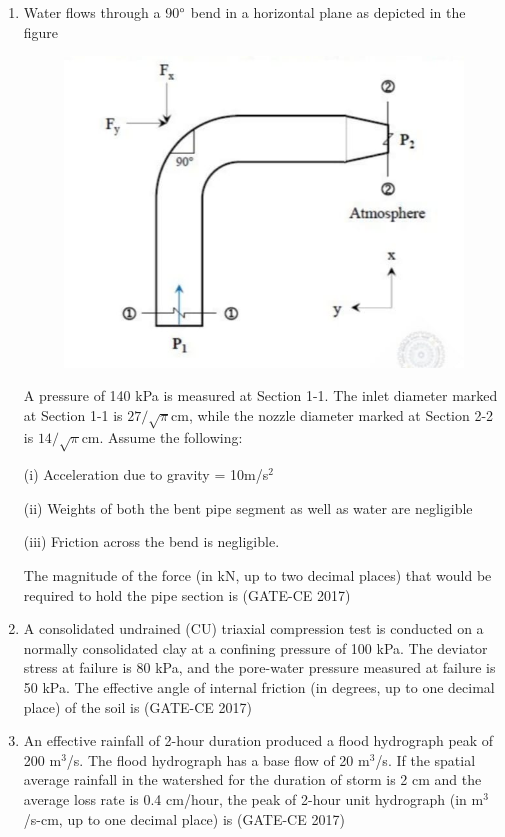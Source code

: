 \documentclass[journal,12pt,onecolumn]{article}
\theoremstyle{remark}
\begin{document}
\begin{enumerate}
    \item Water flows through a 90$\degree$ bend in a horizontal plane as depicted in the figure 
    \begin{figure}[H]
    \centering
    \includegraphics[width=0.7\columnwidth]{figs/imageq49.jpg}  
    \caption{}
    \label{fig:49}
    \end{figure}
    A pressure of 140 kPa is measured at Section 1-1. The inlet diameter marked at Section 1-1 is $27/\sqrt{\pi}$cm, while the nozzle diameter marked at Section 2-2 is $14/\sqrt{\pi}$cm. Assume the following:

(i) Acceleration due to gravity = 10m/s$^2$

(ii) Weights of both the bent pipe segment as well as water are negligible

(iii) Friction across the bend is negligible.

    The magnitude of the force (in kN, up to two decimal places) that would be required to hold the pipe section is \underline{\hspace{3cm}}\hfill (GATE-CE 2017)

    \item A consolidated undrained (CU) triaxial compression test is conducted on a normally consolidated clay at a confining pressure of 100 kPa. The deviator stress at failure is 80 kPa, and the pore-water pressure measured at failure is 50 kPa. The effective angle of internal friction (in degrees, up to one decimal place) of the soil is \underline{\hspace{3cm}}\hfill (GATE-CE 2017)

    \item An effective rainfall of 2-hour duration produced a flood hydrograph peak of 200 m$^3$/s. The flood hydrograph has a base flow of 20 m$^3$/s. If the spatial average rainfall in the watershed for the duration of storm is 2 cm and the average loss rate is 0.4 cm/hour, the peak of 2-hour unit hydrograph (in m$^3$/s-cm, up to one decimal place) is \underline{\hspace{3cm}}\hfill (GATE-CE 2017)


\end{enumerate}
\end{document}
